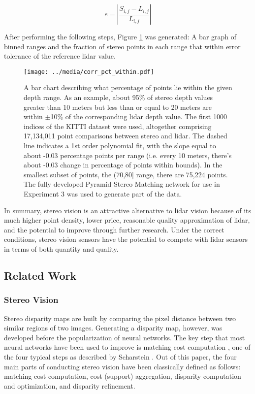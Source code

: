 \begin{equation}
    e = \left | \frac{S_{i,j} - L_{i,j}}{L_{i,j}} \right |
    \label{eq_errCalc}
\end{equation}

After performing the following steps, Figure \ref{corr_stereo_lidar} was generated: A bar graph of binned ranges and the fraction of stereo points in each range that within error tolerance of the reference lidar value.

\begin{figure}[ht]
	\centering
	\texttt{[image: ../media/corr\_pct\_within.pdf]}
	\caption{A bar chart describing what percentage of points lie within the given depth range. As an example, about 95\% of stereo depth values greater than 10 meters but less than or equal to 20 meters are within $\pm$10\% of the corresponding lidar depth value. The first 1000 indices of the KITTI dataset were used, altogether comprising 17,134,011 point comparisons between stereo and lidar. The dashed line indicates a 1st order polynomial fit, with the slope equal to about -0.03 percentage points per range (i.e. every 10 meters, there's about -0.03 change in percentage of points within bounds). In the smallest subset of points, the (70,80] range, there are 75,224 points. The fully developed Pyramid Stereo Matching network for use in Experiment 3 was used to generate part of the data.}
	\label{corr_stereo_lidar}
\end{figure}

In summary, stereo vision is an attractive alternative to lidar vision because of its much higher point density, lower price, reasonable quality approximation of lidar, and the potential to improve through further research. Under the correct conditions, stereo vision sensors have the potential to compete with lidar sensors in terms of both quantity and quality.



\newpage
\subsection{Related Work} %

\subsubsection{Stereo Vision}
Stereo disparity maps are built by comparing the pixel distance between two similar regions of two images. Generating a disparity map, however, was developed before the popularization of neural networks. The key step that most neural networks have been used to improve is matching cost computation \cite{chang_pyramid_2018},  one of the four typical steps as described by Scharstein \cite{scharstein_taxonomy_2002}. Out of this paper, the four main parts of conducting stereo vision have been classically defined as follows: matching cost computation, cost (support) aggregation, disparity computation and optimization, and disparity refinement.

